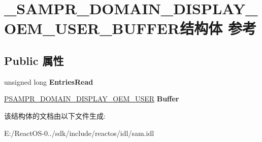 \hypertarget{struct___s_a_m_p_r___d_o_m_a_i_n___d_i_s_p_l_a_y___o_e_m___u_s_e_r___b_u_f_f_e_r}{}\section{\+\_\+\+S\+A\+M\+P\+R\+\_\+\+D\+O\+M\+A\+I\+N\+\_\+\+D\+I\+S\+P\+L\+A\+Y\+\_\+\+O\+E\+M\+\_\+\+U\+S\+E\+R\+\_\+\+B\+U\+F\+F\+E\+R结构体 参考}
\label{struct___s_a_m_p_r___d_o_m_a_i_n___d_i_s_p_l_a_y___o_e_m___u_s_e_r___b_u_f_f_e_r}
\subsection*{Public 属性}
\begin{DoxyCompactItemize}
\item 
\mbox{\label{struct___s_a_m_p_r___d_o_m_a_i_n___d_i_s_p_l_a_y___o_e_m___u_s_e_r___b_u_f_f_e_r_ac6ed2799db3cdb92f1ea05a0b470d121}} 
unsigned long {\bfseries Entries\+Read}
\item 
\mbox{\label{struct___s_a_m_p_r___d_o_m_a_i_n___d_i_s_p_l_a_y___o_e_m___u_s_e_r___b_u_f_f_e_r_ad016e3f67000e067a45bdd82e4b0e57f}} 
\hyperlink{struct___s_a_m_p_r___d_o_m_a_i_n___d_i_s_p_l_a_y___o_e_m___u_s_e_r}{P\+S\+A\+M\+P\+R\+\_\+\+D\+O\+M\+A\+I\+N\+\_\+\+D\+I\+S\+P\+L\+A\+Y\+\_\+\+O\+E\+M\+\_\+\+U\+S\+ER} {\bfseries Buffer}
\end{DoxyCompactItemize}


该结构体的文档由以下文件生成\+:\begin{DoxyCompactItemize}
\item 
E\+:/\+React\+O\+S-\/0../sdk/include/reactos/idl/sam.\+idl\end{DoxyCompactItemize}
